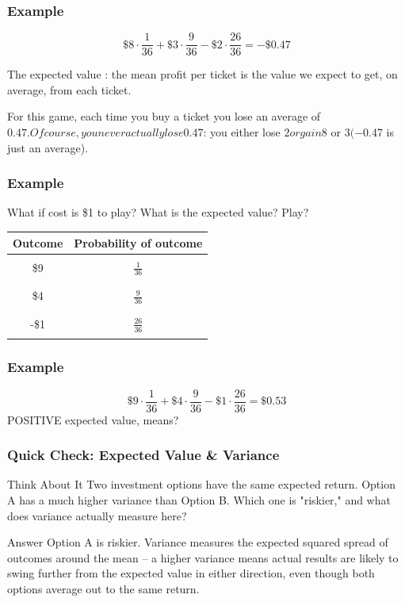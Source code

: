\begin{frame}
\frametitle{Example}

\begin{equation*}
\$8\cdot \frac{1}{36} + \$3\cdot \frac{9}{36} -\$2\cdot \frac{26}{36}=-\$0.47
\end{equation*}

The expected value : the mean profit per ticket is the value we expect to get, on average, from each ticket.

For this game, each time you buy a ticket you lose an average of $0.47. Of course, you never actually lose $0.47: you either lose $2 or gain $8 or $3 (-$0.47 is just an average).
\end{frame}



\begin{frame}
\frametitle{Example}
What if cost is \$1 to play?  What is the expected value?  Play?

\begin{center}
\begin{tabular}{|c|c|}
\hline
Outcome	&Probability of outcome\\
\hline
&\\
\$9  & $\frac{1}{36}$ \\
&\\
\hline
&\\
\$4& $\frac{9}{36}$ \\
&\\
\hline
&\\
-\$1& $\frac{26}{36}$\\
&\\
\hline
\end{tabular} 
\end{center}
\end{frame}

\begin{frame}
\frametitle{Example}
\begin{equation*}
\$9\cdot \frac{1}{36} + \$4\cdot \frac{9}{36} -\$1\cdot \frac{26}{36}= \$0.53
\end{equation*}
POSITIVE expected value, means?
\end{frame}

\begin{frame}[fragile]\frametitle{Quick Check: Expected Value \& Variance}
\begin{block}{Think About It}
Two investment options have the same expected return. Option A has a much higher variance than Option B. Which one is "riskier," and what does variance actually measure here?
\end{block}
\pause
\begin{block}{Answer}
Option A is riskier. Variance measures the expected squared spread of outcomes around the mean -- a higher variance means actual results are likely to swing further from the expected value in either direction, even though both options average out to the same return.
\end{block}
\end{frame}

